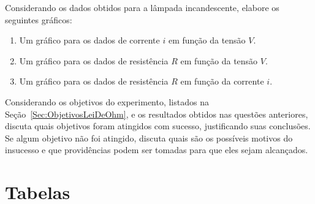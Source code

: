 \begin{question}[type={exam}]{2.5}
Considerando os dados obtidos para a lâmpada incandescente, elabore os seguintes gráficos:
\begin{enumerate}[label=\roman*.]
\item Um gráfico para os dados de corrente $i$ em função da tensão $V$.
\item Um gráfico para os dados de resistência $R$ em função da tensão $V$.
\item Um gráfico para os dados de resistência $R$ em função da corrente $i$.
\end{enumerate}
\end{question}

\begin{question}[type={exam}]{2.5}
Considerando os objetivos do experimento, listados na Seção~\ref{Sec:ObjetivosLeiDeOhm}, e os resultados obtidos nas questões anteriores, discuta quais objetivos foram atingidos com sucesso, justificando suas conclusões. Se algum objetivo não foi atingido, discuta quais são os possíveis motivos do insucesso e que providências podem ser tomadas para que eles sejam alcançados.
\end{question}


\vfill
\pagebreak
\section{Tabelas}

